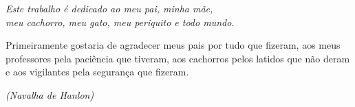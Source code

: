 \documentclass[
	12pt,			%
	openany,		%
	oneside,		%
	a4paper,		%
	english,		%
	brazil			%
	]{abntex2}
\begin{document}

\frenchspacing  %


\imprimircapa

\imprimirfolhaderosto*  %

%
%     
\imprimirfichacatalografica


% 

\begin{dedicatoria}
   \vspace*{\fill} \centering \noindent 
   \textit{ Este trabalho é dedicado ao meu pai, minha mãe,\\
   meu cachorro, meu gato, meu periquito e todo mundo.} 
   \vspace*{\fill}
\end{dedicatoria}

\begin{agradecimentos}
  Primeiramente gostaria de agradecer meus pais por tudo que fizeram,
  aos meus professores pela paciência que tiveram,
  aos cachorros pelos latidos que não deram
  e aos vigilantes pela segurança que fizeram.
\end{agradecimentos}

\begin{epigrafe}
   \vspace*{\fill}
   \begin{flushright}
	\textit{
	(Navalha de Hanlon) }
   \end{flushright}
\end{epigrafe}
\end{document}
